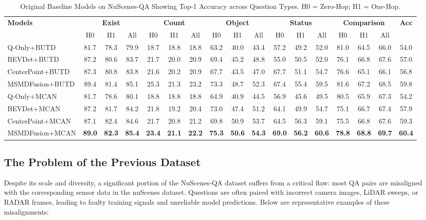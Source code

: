 \documentclass{article} %
\renewcommand{\arraystretch}{1.25}
\begin{document}
\begin{table}[H]
\centering
\scriptsize
\setlength{\tabcolsep}{3pt}
\renewcommand{\arraystretch}{1.2}
\begin{tabular}{l|ccc|ccc|ccc|ccc|ccc|c}
\toprule
\textbf{Models} & \multicolumn{3}{c|}{\textbf{Exist}} & \multicolumn{3}{c|}{\textbf{Count}} & \multicolumn{3}{c|}{\textbf{Object}} & \multicolumn{3}{c|}{\textbf{Status}} & \multicolumn{3}{c|}{\textbf{Comparison}} & \textbf{Acc} \\
 & H0 & H1 & All & H0 & H1 & All & H0 & H1 & All & H0 & H1 & All & H0 & H1 & All & \\
\midrule
Q-Only+BUTD & 81.7 & 78.3 & 79.9 & 18.7 & 18.8 & 18.8 & 63.2 & 40.0 & 43.4 & 57.2 & 49.2 & 52.0 & 81.0 & 64.5 & 66.0 & 54.0 \\
BEVDet+BUTD & 87.2 & 80.6 & 83.7 & 21.7 & 20.0 & 20.9 & 69.4 & 45.2 & 48.8 & 55.0 & 50.5 & 52.0 & 76.1 & 66.8 & 67.6 & 57.0 \\
CenterPoint+BUTD & 87.3 & 80.8 & 83.8 & 21.6 & 20.2 & 20.9 & 67.7 & 43.5 & 47.0 & 67.7 & 51.1 & 54.7 & 76.6 & 65.1 & 66.1 & 56.8 \\
MSMDFusion+BUTD & 89.4 & 81.4 & 85.1 & 25.3 & 21.3 & 23.2 & 73.3 & 48.7 & 52.3 & 67.4 & 55.4 & 59.5 & 81.6 & 67.2 & 68.5 & 59.8 \\
\midrule
Q-Only+MCAN & 81.7 & 78.6 & 80.1 & 18.8 & 18.8 & 18.8 & 64.9 & 40.9 & 44.5 & 56.9 & 45.6 & 49.5 & 80.5 & 65.9 & 67.3 & 54.2 \\
BEVDet+MCAN & 87.2 & 81.7 & 84.2 & 21.8 & 19.2 & 20.4 & 73.0 & 47.4 & 51.2 & 64.1 & 49.9 & 54.7 & 75.1 & 66.7 & 67.4 & 57.9 \\
CenterPoint+MCAN & 87.1 & 82.4 & 84.6 & 21.7 & 20.8 & 21.2 & 69.8 & 50.9 & 53.7 & 64.5 & 56.3 & 59.1 & 75.5 & 66.8 & 67.6 & 59.3 \\
MSMDFusion+MCAN & \textbf{89.0} & \textbf{82.3} & \textbf{85.4} & \textbf{23.4} & \textbf{21.1} & \textbf{22.2} & \textbf{75.3} & \textbf{50.6} & \textbf{54.3} & \textbf{69.0} & \textbf{56.2} & \textbf{60.6} & \textbf{78.8} & \textbf{68.8} & \textbf{69.7} & \textbf{60.4} \\
\bottomrule
\end{tabular}
\caption{Original Baseline Models on NuScenes-QA Showing Top-1 Accuracy across Question Types. H0 = Zero-Hop; H1 = One-Hop.}
\label{tab:nuscenes-baselines}
\end{table}

\subsection{The Problem of the Previous Dataset}
Despite its scale and diversity, a significant portion of the NuScenes-QA dataset suffers from a critical flaw: most QA pairs are misaligned with the corresponding sensor data in the nuScenes dataset. Questions are often paired with incorrect camera images, LiDAR sweeps, or RADAR frames, leading to faulty training signals and unreliable model predictions. Below are representative examples of these misalignments:
\end{document}
